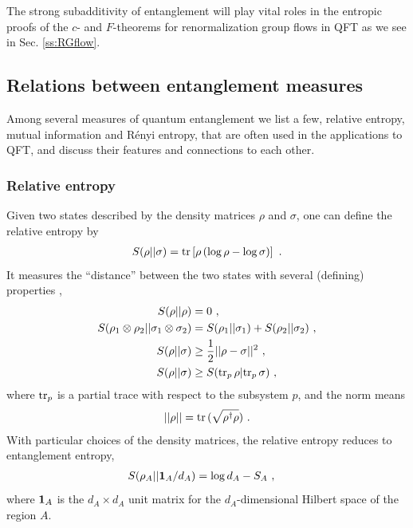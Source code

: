 The strong subadditivity of entanglement will play vital roles in the entropic proofs of the $c$- and $F$-theorems for renormalization group flows in QFT as we see in Sec. \ref{ss:RGflow}.


\subsection{Relations between entanglement measures}
Among several measures of quantum entanglement we list a few, relative entropy, mutual information and R{\'e}nyi entropy, that are often used in the applications to QFT, and discuss their features and connections to each other.

\subsubsection{Relative entropy}
Given two states described by the density matrices $\rho$ and $\sigma$, one can define the relative entropy by \cite{umegaki1962conditional}
\begin{align}\label{RelEnt}
S(\rho || \sigma) = \tr \left[ \rho\, (\log \rho -\log \sigma) \right]\ .
\end{align}
It measures the ``distance'' between the two states with several (defining) properties \cite{ohya2004quantum,Vedral:2002zz},
\begin{align}
S(\rho|| \rho) &= 0 \ , \\
S(\rho_1 \otimes \rho_2|| \sigma_1\otimes \sigma_2) &= S( \rho_1|| \sigma_1) + S( \rho_2 || \sigma_2)\ , \\
S(\rho|| \sigma) &\ge \frac{1}{2} || \rho - \sigma ||^2 \ , \label{RelEn}\\
S(\rho|| \sigma) &\ge S({\rm tr}_p\, \rho | {\rm tr}_p\, \sigma) \ , \label{RelEnMon}
\end{align}
where ${\rm tr}_p$ is a partial trace with respect to the subsystem $p$, and the norm means
\begin{align}
|| \rho || = {\rm tr}\, (\sqrt{\rho^\dagger \rho}) \ .
\end{align}
With particular choices of the density matrices, the relative entropy reduces to entanglement entropy,
\begin{align}\label{RelEnMutual}
\begin{aligned}
S(\rho_A || {\bf 1}_A/d_A) &= \log d_A - S_A \ , 
\end{aligned}
\end{align}
where ${\bf 1}_A$ is the $d_A \times d_A$ unit matrix for the $d_A$-dimensional Hilbert space of the region $A$.


